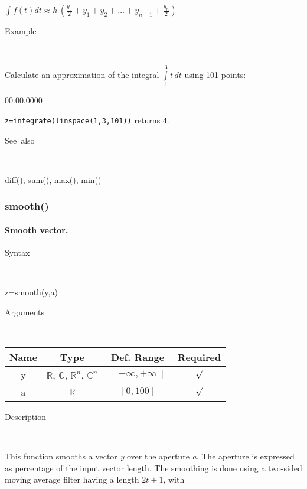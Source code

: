 \medskip{}
$\int f\left(t\right)dt\approx h\,\left({\displaystyle \frac{y_{0}}{2}}+y_{1}+y_{2}+\ldots+y_{n-1}+{\displaystyle \frac{y_{n}}{2}}\right)$
\medskip{}

\begin{description}
\item [Example]~
\end{description}
Calculate an approximation of the integral $\int\limits _{1}^{3}t\, dt$
using 101 points:

\begin{lyxlist}{00.00.0000}
\item [\texttt{z=integrate(linspace(1,3,101))}]returns
4.
\end{lyxlist}
\begin{description}
\item [See~also]~
\end{description}
\textcolor{blue}{\hyperlink{diff}{diff()}}\textcolor{black}{,} \textcolor{blue}{\hyperlink{sum}{sum()}}\textcolor{black}{,}
\textcolor{blue}{\hyperlink{max}{max()}}\textcolor{black}{,} \textcolor{blue}{\hyperlink{min}{min()}}


\newpage
\subsubsection*{\hypertarget{smooth}{}{\Large smooth()}}


\paragraph{\label{par:Smooth}Smooth vector.}

\begin{description}
\item [Syntax]~
\end{description}
z=smooth(y,a)

\begin{description}
\item [Arguments]~
\end{description}
\begin{tabular}{|c|c|c|c|}
\hline 
Name&
Type&
Def. Range&
Required\tabularnewline
\hline
\hline 
y&
$\mathbb{R}$, $\mathbb{C}$, $\mathbb{R}^{n}$, $\mathbb{C}^{n}$&
$\left]-\infty,+\infty\right[$&
$\surd$\tabularnewline
\hline 
a&
$\mathbb{R}$&
$\left[0,100\right]$&
$\surd$\tabularnewline
\hline
\end{tabular}

\begin{description}
\item [Description]~
\end{description}
This function smooths a vector \textit{y} over the aperture
\textit{a}. The aperture is expressed as percentage of the input vector length. 
The smoothing is done using a two-sided moving average filter having a length $2t+1$,
with

